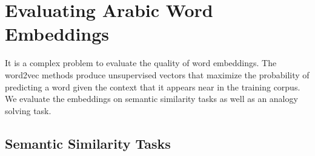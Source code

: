 \chapter{Evaluating Arabic Word Embeddings}
\label{sec:evaluation}


It is a complex problem to evaluate the quality of word embeddings. The word2vec methods produce unsupervised vectors that maximize the probability of predicting a word given the context that it appears near in the training corpus. We evaluate the embeddings on semantic similarity tasks as well as an analogy solving task. 

\section{Semantic Similarity Tasks}

